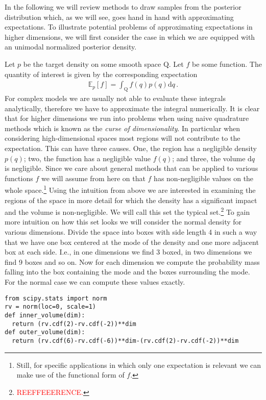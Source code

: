 In the following we will review methods to draw samples from the posterior
distribution which, as we will see, goes hand in hand with approximating expectations.
To illustrate potential problems of approximating expectations in higher dimensions,
we will first consider the case in which we are equipped with an unimodal normalized posterior density.

Let $p$ be the target density on some smooth space $\mathrm{Q}$.
Let $f$ be some function.
The quantity of interest is given by the corresponding expectation
\begin{align}
    \mathbb{E}_p \left[f\right] = \int_{\mathrm{Q}} f(q) p(q) \mathrm{d}q \,.
\end{align}
For complex models we are usually not able to evaluate these integrals analytically,
therefore we have to approximate the integral numerically.
It is clear that for higher dimensions we run into problems when using naive
quadrature methods which is known as the \emph{curse of dimensionality}.
In particular when considering high-dimensional spaces most regions will not
contribute to the expectation. This can have three causes. One, the region has a
negligible density $p(q)$; two, the function has a negligible value $f(q)$;
and three, the volume $\mathrm{d}q$ is negligible. Since we care about general
methods that can be applied to various functions $f$ we will assume from here on
that $f$ has non-negligible values on the whole space.\footnote{Still, for specific applications
in which only one expectation is relevant we can make use of the functional form of
$f$.}
Using the intuition from above we are interested in examining the regions of the
space in more detail for which the density has a significant impact and the
volume is non-negligible. We will call this set the typical set.\footnote{\textcolor{red}{REEFFEEERENCE.}}
To gain more intuition on how this set looks we will consider the normal density
for various dimensions. Divide the space into boxes with
side length 4 in such a way that we have one box centered at the mode of the
density and one more adjacent box at each side. I.e., in one dimensions we
find 3 boxed, in two dimensions we find 9 boxes and so on. Now for each dimension
we compute the probability mass falling into the box containing the mode and the
boxes surrounding the mode. For the normal case we can compute these values exactly.

\begin{lstlisting}
from scipy.stats import norm
rv = norm(loc=0, scale=1)
def inner_volume(dim):
  return (rv.cdf(2)-rv.cdf(-2))**dim
def outer_volume(dim):
  return (rv.cdf(6)-rv.cdf(-6))**dim-(rv.cdf(2)-rv.cdf(-2))**dim
\end{lstlisting}


